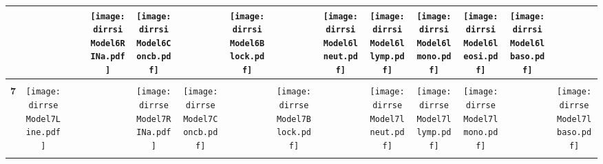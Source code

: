 \documentclass[landscape]{article}
\def \dirrsi{/run/user/1000/gvfs/smb-share:server=cyfiles.iastate.edu,share=09/22/ntyet/R/RA/Data/RFI-newdata/resultsimulation/Model6.Line.Concb.RINa.lneut.llymp.lmono.leosi.lbaso.Block/}
\def \dirrse{/run/user/1000/gvfs/smb-share:server=cyfiles.iastate.edu,share=09/22/ntyet/R/RA/Data/RFI-newdata/resultsimulation/Model7.Line.Concb.RINa.lneut.llymp.lmono.lbaso.Block/}
\begin{document}
\begin{table}
\begin{tabular}{ccccccccccccccc}
      &
      &
      &
      &\texttt{[image: \\dirrsi Model6RINa.pdf]}
      &\texttt{[image: \\dirrsi Model6Concb.pdf]}
      &
      &\texttt{[image: \\dirrsi Model6Block.pdf]}
      &
      &\texttt{[image: \\dirrsi Model6lneut.pdf]}
      &\texttt{[image: \\dirrsi Model6llymp.pdf]}
      &\texttt{[image: \\dirrsi Model6lmono.pdf]}
      &\texttt{[image: \\dirrsi Model6leosi.pdf]}
      &\texttt{[image: \\dirrsi Model6lbaso.pdf]}
     \\[3.5pt]
     \hline
     \\[3.5pt]
     {\Huge \textbf{7}} 
      &\texttt{[image: \\dirrse Model7Line.pdf]}
      &
      &
      &
      &\texttt{[image: \\dirrse Model7RINa.pdf]}
      &\texttt{[image: \\dirrse Model7Concb.pdf]}
      &
      &\texttt{[image: \\dirrse Model7Block.pdf]}
      &
      &\texttt{[image: \\dirrse Model7lneut.pdf]}
      &\texttt{[image: \\dirrse Model7llymp.pdf]}
      &\texttt{[image: \\dirrse Model7lmono.pdf]}
      &
      &\texttt{[image: \\dirrse Model7lbaso.pdf]}
     \\[3.5pt]
     \hline
     \\[3.5pt]

\end{tabular}
\end{table}
\end{document}
